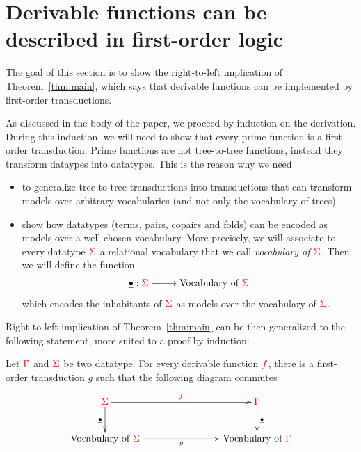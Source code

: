 
\section{Derivable functions can be described in first-order logic}
\label{sec:to-logic}
The goal of this section is to show the right-to-left implication of Theorem~\ref{thm:main}, which says that derivable functions can be implemented by first-order transductions. 

As discussed in the body of the paper, we proceed by induction on the derivation. During this induction, we will need to show that every prime function is a first-order transduction. Prime functions are not tree-to-tree functions, instead they transform dataypes into datatypes. This is the reason why we need 
\begin{itemize}
\item to generalize tree-to-tree transductions into  transductions that can transform models over arbitrary vocabularies (and not only the vocabulary of trees). 
\item show how datatypes (terms, pairs, copairs and folds) can be encoded as models over a well chosen vocabulary. More precisely, we will associate to every datatype ${\color{red}{\Sigma}}$ a relational vocabulary that we call \emph{vocabulary of ${\color{red}{\Sigma}}$}. Then we will define the function
\begin{align*}
\underline{\bullet}: {\color{red}{\Sigma}} \xrightarrow{\qquad} \text{Vocabulary of ${\color{red}{\Sigma}}$}
\end{align*} 
which encodes the inhabitants of ${\color{red}{\Sigma}}$ as models over the vocabulary of ${\color{red}{\Sigma}}$.
\end{itemize}
 
 Right-to-left implication of Theorem~\ref{thm:main} can be then generalized to the following statement, more suited to a proof by induction:

\begin{proposition}\label{prop:main-right-to-left}
Let ${\color{red}{\Gamma}}$ and ${\color{red}{\Sigma}}$ be two datatype.  For every derivable function ${\color{red}{f}}$, there is a first-order transduction $g$ such that the following diagram commutes
  \begin{align*}
  \xymatrix@C=2.8cm{
          \rSigma 
        \ar[d]_{\substack{\underline{\bullet}}}
        \ar[r]^-{\ranked{f}}
        &
    \rGamma \ar[d]^{\substack{\underline{\bullet}}}
        \\
      \text{Vocabulary of $\rSigma$}
        \ar[r]_-{g}
        &
    \text{Vocabulary of $\rGamma$}   
    } 
\end{align*}  
\end{proposition}

